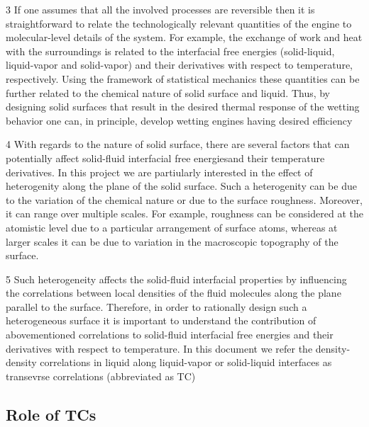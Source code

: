 \par 3 If one assumes that all the involved processes are reversible then it is straightforward to relate the technologically relevant quantities of the engine to molecular-level details of the system. For example, the exchange of work and heat with the surroundings is related to the interfacial free energies (solid-liquid, liquid-vapor and solid-vapor) and their derivatives with respect to temperature, respectively. Using the framework of statistical mechanics these quantities can be further related to the chemical nature of solid surface and liquid. Thus, by designing solid surfaces that result in the desired thermal response of the wetting behavior one can, in principle, develop wetting engines having desired efficiency
\par 4 With regards to the nature of solid surface, there are several factors that can potentially affect solid-fluid interfacial free energiesand their temperature derivatives. In this project we are partiularly interested in the effect of heterogenity along the plane of the solid surface. Such a heterogenity can be due to the variation of the chemical nature or due to the surface roughness. Moreover,  it can range over multiple scales. For example, roughness can be considered at the atomistic level due to a particular arrangement of surface atoms, whereas at larger scales it can be due to variation in the macroscopic topography of the surface.
\par 5 Such heterogeneity affects the solid-fluid interfacial properties by influencing the correlations between local densities of the fluid molecules along the plane parallel to the surface. Therefore, in order to rationally design such a heterogeneous surface it is important to understand the contribution of abovementioned correlations to solid-fluid interfacial free energies and their derivatives with respect to temperature. In this document we refer the density-density correlations in liquid along liquid-vapor or solid-liquid interfaces as transevrse correlations (abbreviated as TC)\subsection{Role of TCs}

